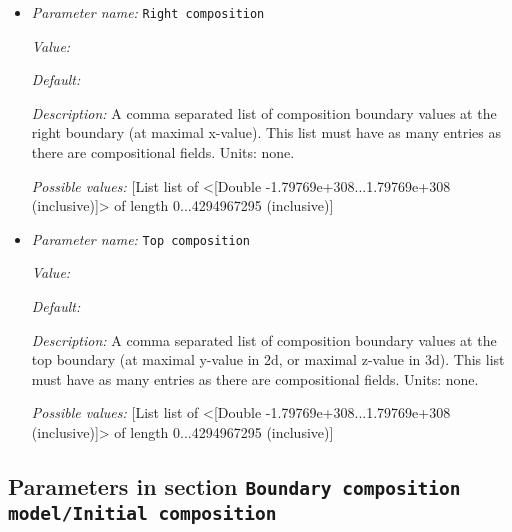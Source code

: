 \begin{itemize}
{\it Value:} 


{\it Default:} 


{\it Description:} A comma separated list of composition boundary values at the left boundary (at minimal x-value). This list must have as many entries as there are compositional fields. Units: none.


{\it Possible values:} [List list of <[Double -1.79769e+308...1.79769e+308 (inclusive)]> of length 0...4294967295 (inclusive)]
\item {\it Parameter name:} {\tt Right composition}
\label{parameters:Boundary composition model/Box/Right composition}


{\it Value:} 


{\it Default:} 


{\it Description:} A comma separated list of composition boundary values at the right boundary (at maximal x-value). This list must have as many entries as there are compositional fields. Units: none.


{\it Possible values:} [List list of <[Double -1.79769e+308...1.79769e+308 (inclusive)]> of length 0...4294967295 (inclusive)]
\item {\it Parameter name:} {\tt Top composition}
\label{parameters:Boundary composition model/Box/Top composition}


{\it Value:} 


{\it Default:} 


{\it Description:} A comma separated list of composition boundary values at the top boundary (at maximal y-value in 2d, or maximal z-value in 3d). This list must have as many entries as there are compositional fields. Units: none.


{\it Possible values:} [List list of <[Double -1.79769e+308...1.79769e+308 (inclusive)]> of length 0...4294967295 (inclusive)]
\end{itemize}

\subsection{Parameters in section \tt Boundary composition model/Initial composition}
\label{parameters:Boundary_20composition_20model/Initial_20composition}


